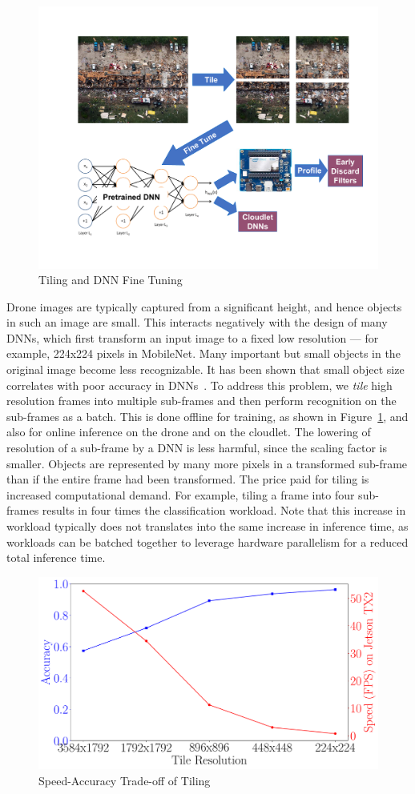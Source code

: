 \begin{figure}
\centering
\includegraphics[width=0.8\linewidth]{FIGS/fig-training.pdf}
\caption{Tiling and DNN Fine Tuning}
\label{fig:tiling}
\end{figure}

Drone images are typically captured from a significant height, and hence objects
in such an image are small.  This interacts negatively with the design of many
DNNs, which first transform an input image to a fixed low resolution --- for
example, 224x224 pixels in MobileNet. Many important but small objects in the
original image become less recognizable.  It has been shown that small object
size correlates with poor accuracy in DNNs~\cite{Huang2017}.  To address this
problem, we {\em tile} high resolution frames into multiple sub-frames and then
perform recognition on the sub-frames as a batch.  This is done offline for
training, as shown in Figure~\ref{fig:tiling}, and also for online inference on
the drone and on the cloudlet.  The lowering of resolution of a sub-frame by a
DNN is less harmful, since the scaling factor is smaller.  Objects are
represented by many more pixels in a transformed sub-frame than if the entire
frame had been transformed.  The price paid for tiling is increased
computational demand.  For example, tiling a frame into four sub-frames results
in four times the classification workload. Note that this increase in workload
typically does not translates into the same increase in inference time, as
workloads can be batched together to leverage hardware parallelism for a reduced
total inference time.

\begin{figure}
\centering
\includegraphics[width=.8\linewidth]{FIGS/fig-tile-resolution-speed-accuracy.pdf}
\caption{Speed-Accuracy Trade-off of Tiling}
\label{fig:earlydiscard-tile-accuracy-speed}
\end{figure}


